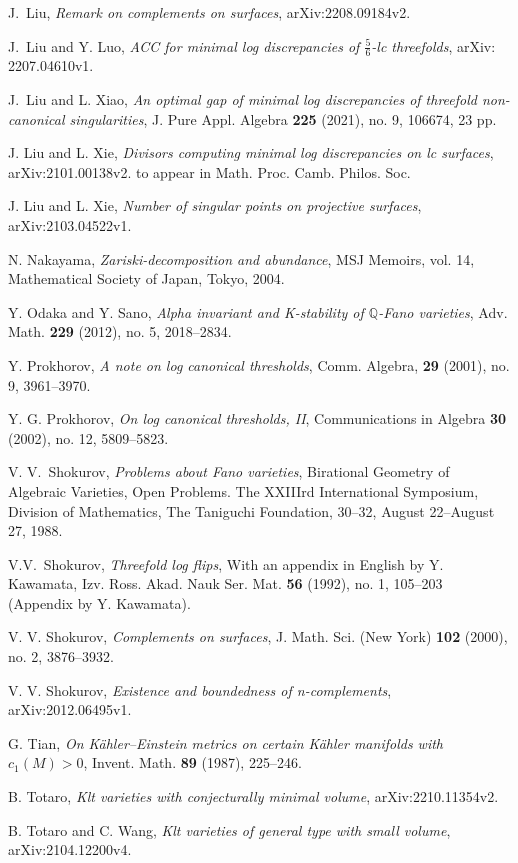 \documentclass[11pt]{amsart}
\numberwithin{equation}{section}
\theoremstyle{definition}
\theoremstyle{definition}
\theoremstyle{definition}
\begin{document}
\begin{thebibliography}{ABCDE}
 J.~Liu, \textit{Remark on complements on surfaces}, arXiv:2208.09184v2. 

 J.~Liu and Y. Luo, \textit{ACC for minimal log discrepancies of $\frac{5}{6}$-lc threefolds}, arXiv: 2207.04610v1.

 J.~Liu and L. Xiao, \textit{An optimal gap of minimal log discrepancies of threefold non-canonical singularities}, J. Pure Appl. Algebra \textbf{225} (2021), no. 9, 106674, 23 pp.

 J. Liu and L. Xie, \textit{Divisors computing minimal log discrepancies on lc surfaces}, arXiv:2101.00138v2. to appear in Math. Proc. Camb. Philos. Soc.

 J. Liu and L. Xie, \textit{Number of singular points on projective surfaces}, arXiv:2103.04522v1.



 N. Nakayama, \textit{Zariski-decomposition and abundance}, MSJ Memoirs, vol. 14, Mathematical Society of Japan, Tokyo, 2004.

 Y. Odaka and Y. Sano, \textit{Alpha invariant and K-stability of $\mathbb Q$-Fano varieties},  Adv. Math. \textbf{229} (2012), no. 5, 2018--2834.

 Y. Prokhorov, \textit{A note on log canonical thresholds}, Comm. Algebra, \textbf{29} (2001), no. 9, 3961--3970.

 Y. G. Prokhorov, \textit{On log canonical thresholds, II}, Communications in Algebra \textbf{30} (2002), no. 12, 5809--5823.

 V. V.~Shokurov, \textit{Problems about Fano varieties}, Birational Geometry of Algebraic Varieties, Open Problems. The XXIIIrd International Symposium, Division of Mathematics, The Taniguchi Foundation, 30--32, August 22--August 27, 1988.

 V.V.~Shokurov, \textit{Threefold log flips}, With an appendix in English by Y. Kawamata, Izv. Ross. Akad. Nauk Ser. Mat. \textbf{56} (1992), no. 1, 105--203 (Appendix by Y. Kawamata).


 V. V. Shokurov, \textit{Complements on surfaces}, J. Math. Sci. (New York) \textbf{102} (2000), no. 2, 3876--3932.

 V. V. Shokurov, \textit{Existence and boundedness of n-complements}, arXiv:2012.06495v1.

 G. Tian, \textit{On K\"ahler–Einstein metrics on certain K\"ahler manifolds with $c_1(M)>0$}, Invent. Math. \textbf{89} (1987), 225--246.

 B. Totaro, \textit{Klt varieties with conjecturally minimal volume}, arXiv:2210.11354v2.

 B. Totaro and C. Wang, \textit{Klt varieties of general type with small volume}, arXiv:2104.12200v4.
\end{thebibliography}
\end{document}
